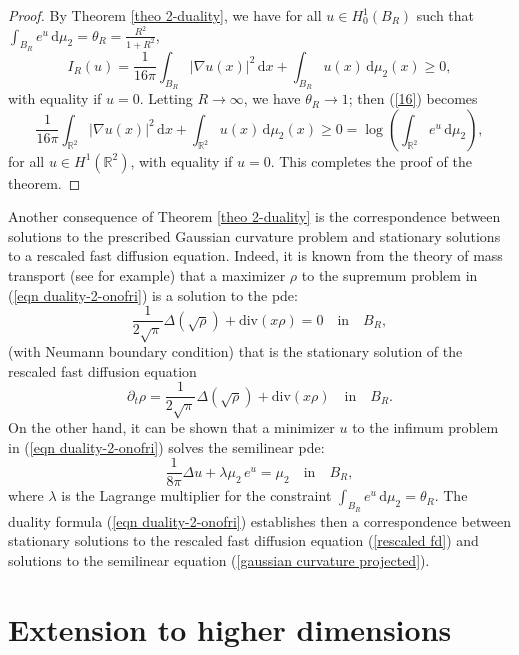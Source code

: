 \documentclass[10pt]{article}
\numberwithin{equation}{section}
\theoremstyle{plain}
\theoremstyle{definition}
\theoremstyle{remark}
\newcommand\R{{\mathbb R}}
\newcommand{\ib}{\int_{B_R}}
\newcommand\dd{\,\mbox{d} }
\def\div{\mbox{div} }
\begin{document}
\begin{proof} By Theorem  \ref{theo 2-duality}, we have for all $u\in H^1_0(B_R)$ such that $\ib e^u\dd\mu_2 =\theta_R=\frac{R^2}{1+R^2}$,
\begin{equation}\label{16}
I_R(u) =  \frac{1}{16\pi} \int_{B_R} |\nabla u(x)|^2\dd x + \int_{B_R} u(x)\dd \mu_2(x) \geq 0,
\end{equation}
with equality if $u=0$. Letting $R\to\infty$, we have $\theta_R\to 1$; then (\ref{16}) becomes
\[\frac{1}{16\pi} \int_{\R^2} |\nabla u(x)|^2\dd x + \int_{\R^2} u(x)\dd \mu_2(x) \geq 0 = \log\left(\int_{\R^2} e^u\dd\mu_2\right),\]
for all $u\in H^1(\R^2)$, with equality if $u=0$. This completes the proof of the theorem.
\end{proof}

Another consequence of Theorem  \ref{theo 2-duality} is the correspondence between solutions to the prescribed Gaussian curvature problem and stationary solutions to a  rescaled fast diffusion equation.
Indeed, it is known from the theory of mass transport (see \cite{vi} for example) that a maximizer $\rho$ to the supremum problem in (\ref{eqn duality-2-onofri}) is a solution to the pde:
\[\frac{1}{2\sqrt{\pi}} \Delta(\sqrt{\rho}) + \div(x\rho)=0 \quad \mbox{in} \quad  B_R,\]
(with Neumann boundary condition) that is the stationary solution of the rescaled fast diffusion equation
\begin{equation}\label{rescaled fd}
\partial_t\rho = \frac{1}{2\sqrt{\pi}} \Delta(\sqrt{\rho}) + \div(x\rho) \quad \mbox{in}\quad B_R.
\end{equation}
On the other hand, it can be shown that a minimizer $u$ to the infimum problem in (\ref{eqn duality-2-onofri}) solves the semilinear pde:
\begin{equation}\label{gaussian curvature projected}
\frac{1}{8\pi}\Delta u +\lambda \mu_2\, e^u = \mu_2 \quad \mbox{in}\quad B_R,
\end{equation}
where $\lambda$ is the Lagrange multiplier for the constraint $\int_{B_R} e^u\dd \mu_2=\theta_R$. The duality formula (\ref{eqn duality-2-onofri}) establishes then a correspondence between stationary solutions to the rescaled fast diffusion equation (\ref{rescaled fd}) and solutions to the semilinear equation (\ref{gaussian curvature projected}).



\section{Extension to higher dimensions} \label{sec3}
\end{document}
